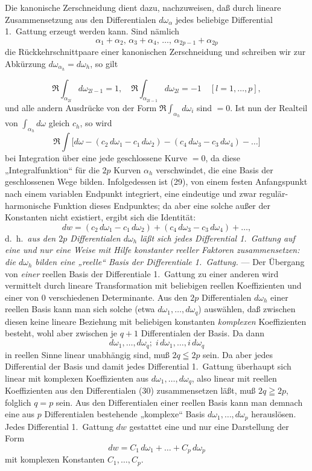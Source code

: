 \documentclass{article}
\begin{document}
Die kanonische Zerschneidung dient dazu, nachzuweisen, daß durch lineare Zusammensetzung aus den Differentialen $d\omega_\alpha$ jedes beliebige Differential 1.\ Gattung erzeugt werden kann. Sind nämlich
\[ \alpha_1 + \alpha_2, \, \alpha_3 + \alpha_4, \, \dots, \, \alpha_{2p-1} + \alpha_{2p} \]
die Rückkehrschnittpaare einer kanonischen Zerschneidung und schreiben wir zur Abkürzung $d\omega_{\alpha_h} = d\omega_h$, so gilt

\[ \Re \int_{\alpha_{2l}} d\omega_{2l-1} = 1, \quad \Re \int_{\alpha_{2l-1}} d\omega_{2l} = -1 \quad [l = 1, \dots, p], \]
und alle andern Ausdrücke von der Form $\Re \displaystyle\int_{\alpha_h} d\omega_i$ sind $= 0$. Ist nun der Realteil von $\displaystyle\int_{\alpha_h} d\omega$ gleich $c_h$, so wird
\[ \Re \int \bigl[ d\omega - (c_2\,d\omega_1 - c_1\,d\omega_2) - (c_4\,d\omega_3 - c_3\,d\omega_4) - \dots \bigr] \tag{29} \]
bei Integration über eine jede geschlossene Kurve $= 0$, da diese „Integralfunktion“ für die $2p$ Kurven $\alpha_h$ verschwindet, die eine Basis der geschlossenen Wege bilden. Infolgedessen ist (29), von einem festen Anfangspunkt nach einem variablen Endpunkt integriert, eine eindeutige und zwar regulär-harmonische Funktion dieses Endpunktes; da aber eine solche außer der Konstanten nicht existiert, ergibt sich die Identität:
\[ dw = (c_2\,d\omega_1 - c_1\,d\omega_2) + (c_4\,d\omega_3 - c_3\,d\omega_4) + \dots, \]
d.~h.\ \emph{aus den $2p$ Differentialen $d\omega_h$ läßt sich jedes Differential 1.~Gattung auf eine und nur eine Weise mit Hilfe konstanter reeller Faktoren zusammensetzen: die $d\omega_h$ bilden eine „reelle“ Basis der Differentiale 1.~Gattung.} --- Der Übergang von \emph{einer} reellen Basis der Differentiale 1.~Gattung zu einer anderen wird vermittelt durch lineare Transformation mit beliebigen reellen Koeffizienten und einer von $0$ verschiedenen Determinante. Aus den $2p$ Differentialen $d\omega_h$ einer reellen Basis kann man sich solche (etwa $d\omega_1, \dots, d\omega_q$) auswählen, daß zwischen diesen keine lineare Beziehung mit beliebigen konstanten \emph{komplexen} Koeffizienten besteht, wohl aber zwischen je $q+1$ Differentialen der Basis. Da dann
\[ d\omega_1, \dots, d\omega_q; \; i\,d\omega_1, \dots, i\,d\omega_q \tag{30} \]
in reellen Sinne linear unabhängig sind, muß $2q \leqq 2p$ sein. Da aber jedes Differential der Basis und damit jedes Differential 1.~Gattung überhaupt sich linear mit komplexen Koeffizienten aus $d\omega_1, \dots, d\omega_q$, also linear mit reellen Koeffizienten aus den Differentialen (30) zusammensetzen läßt, muß $2q \geqq 2p$, folglich $q=p$ sein. Aus den Differentialen einer reellen Basis kann man demnach eine aus $p$ Differentialen bestehende „komplexe“ Basis $d\omega_1, \dots, d\omega_p$ herauslösen. Jedes Differential 1.~Gattung $dw$ gestattet eine und nur eine Darstellung der Form
\[ dw = C_1\,d\omega_1 + \dots + C_p\,d\omega_p \]
mit komplexen Konstanten $C_1, \dots, C_p$.
\end{document}
